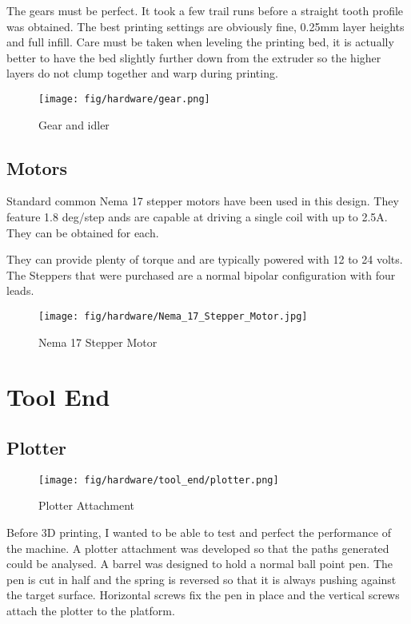 \documentclass[a4paper, 11pt, twoside]{Thesis}  %
\begin{document}
The gears must be perfect. It took a few trail runs before a straight tooth profile was obtained. The best printing settings are obviously fine, 0.25mm layer heights and full infill. Care must be taken when leveling the printing bed, it is actually better to have the bed slightly further down from the extruder so the higher layers do not clump together and warp during printing. 

\begin{figure}[H]
\centering%
\texttt{[image: fig/hardware/gear.png]}
\caption{Gear and idler}
\label{fig:gear.png}
\end{figure}
\subsection{Motors}
Standard common Nema 17 stepper motors have been used in this design. They feature 1.8 deg/step ands are capable at driving a single coil with up to 2.5A. They can be obtained for  each.

They can provide plenty of torque and are typically powered with 12 to 24 volts. The Steppers that were purchased are a normal bipolar configuration with four leads. 

\begin{figure}[H]
\centering%
\texttt{[image: fig/hardware/Nema\_17\_Stepper\_Motor.jpg]}
\caption{Nema 17 Stepper Motor}
\label{fig:Nema_17_Stepper_Motor.jpg}
\end{figure}

\section{Tool End}

\subsection{Plotter}

\begin{figure}[H]
\centering%
\texttt{[image: fig/hardware/tool\_end/plotter.png]}
\caption{Plotter Attachment}
\label{fig:plotter.png}
\end{figure}
Before 3D printing, I wanted to be able to test and perfect the performance of the machine. A plotter attachment was developed so that the paths generated could be analysed. A barrel was designed to hold a normal ball point pen. The pen is cut in half and the spring is reversed so that it is always pushing against the target surface. Horizontal screws fix the pen in place and the vertical screws attach the plotter to the platform.
\end{document}
